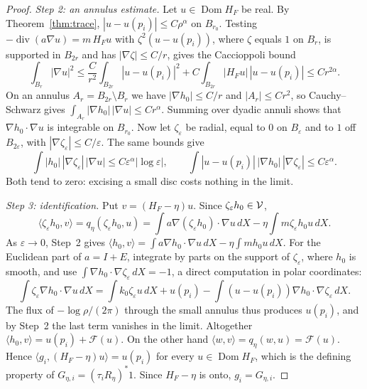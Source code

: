 \documentclass[11pt]{article}
\theoremstyle{definition}\newtheorem{definition}[theorem]{Definition}
\theoremstyle{remark}\newtheorem{remark}[theorem]{Remark}
\newcommand{\Dom}{\operatorname{Dom}}\newcommand{\dd}{\,d}
\begin{document}
\begin{proof}
\emph{Step 2: an annulus estimate.} Let $u\in\Dom H_F$ be real. By
Theorem~\ref{thm:trace}, $|u-u(p_i)|\leq C\rho^\alpha$ on $B_{r_0}$. Testing
$-\operatorname{div}(a\nabla u)=m\,H_Fu$ with $\zeta^2(u-u(p_i))$, where $\zeta$
equals $1$ on $B_r$, is supported in $B_{2r}$ and has $|\nabla\zeta|\leq C/r$,
gives the Caccioppoli bound
\[
 \int_{B_r}|\nabla u|^2\leq\frac C{r^2}\int_{B_{2r}}|u-u(p_i)|^2
 +C\int_{B_{2r}}|H_Fu|\,|u-u(p_i)|\leq Cr^{2\alpha}.
\]
On an annulus $A_r=B_{2r}\setminus B_r$ we have $|\nabla h_0|\leq C/r$ and
$|A_r|\leq Cr^2$, so Cauchy--Schwarz gives
$\int_{A_r}|\nabla h_0|\,|\nabla u|\leq Cr^\alpha$. Summing over dyadic annuli
shows that $\nabla h_0\cdot\nabla u$ is integrable on $B_{r_0}$. Now let
$\zeta_\varepsilon$ be radial, equal to $0$ on $B_\varepsilon$ and to $1$ off
$B_{2\varepsilon}$, with $|\nabla\zeta_\varepsilon|\leq C/\varepsilon$. The same
bounds give
\[
 \int|h_0|\,|\nabla\zeta_\varepsilon|\,|\nabla u|\leq C\varepsilon^\alpha|\log\varepsilon|,\qquad
 \int|u-u(p_i)|\,|\nabla h_0|\,|\nabla\zeta_\varepsilon|\leq C\varepsilon^\alpha .
\]
Both tend to zero: excising a small disc costs nothing in the limit.

\emph{Step 3: identification.} Put $v=(H_F-\eta)u$. Since $\zeta_\varepsilon h_0\in\mathcal V$,
\[
 \langle\zeta_\varepsilon h_0,v\rangle=q_\eta(\zeta_\varepsilon h_0,u)
 =\int a\nabla(\zeta_\varepsilon h_0)\cdot\nabla u\dd X-\eta\int m\zeta_\varepsilon h_0u\dd X .
\]
As $\varepsilon\to0$, Step~2 gives
$\langle h_0,v\rangle=\int a\nabla h_0\cdot\nabla u\dd X-\eta\int mh_0u\dd X$.
For the Euclidean part of $a=I+E$, integrate by parts on the support of
$\zeta_\varepsilon$, where $h_0$ is smooth, and use
$\int\nabla h_0\cdot\nabla\zeta_\varepsilon\dd X=-1$, a direct computation in
polar coordinates:
\[
 \int\zeta_\varepsilon\nabla h_0\cdot\nabla u\dd X
 =\int k_0\zeta_\varepsilon u\dd X+u(p_i)
 -\int(u-u(p_i))\nabla h_0\cdot\nabla\zeta_\varepsilon\dd X .
\]
The flux of $-\log\rho/(2\pi)$ through the small annulus thus produces
$u(p_i)$, and by Step~2 the last term vanishes in the limit. Altogether
$\langle h_0,v\rangle=u(p_i)+\mathcal F(u)$. On the other hand
$\langle w,v\rangle=q_\eta(w,u)=\mathcal F(u)$. Hence
$\langle g_i,(H_F-\eta)u\rangle=u(p_i)$ for every $u\in\Dom H_F$, which is the
defining property of $G_{\eta,i}=(\tau_iR_\eta)^*1$. Since $H_F-\eta$ is onto,
$g_i=G_{\eta,i}$.


\end{proof}
\end{document}
